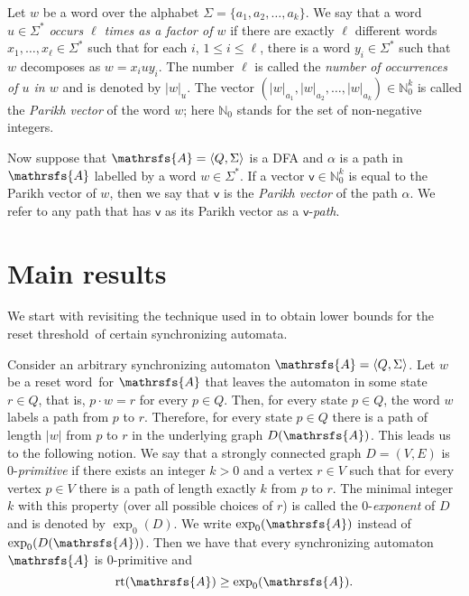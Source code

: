 \documentclass[12pt,twoside]{article}
\newcommand{\sa}{synchronizing automata}
\newcommand{\sw}{reset word}
\newcommand{\reth}{reset threshold}
\DeclareMathOperator{\rt}{rt}
\begin{document}
Let $w$ be a word over the alphabet $\Sigma = \{a_1, a_2, \ldots, a_k\}$. We
say that a word $u\in\Sigma^*$ \emph{occurs $\ell$ times as a factor of $w$} if
there are exactly $\ell$ different words $x_1, \ldots, x_\ell \in \Sigma^*$
such that for each $i$, $1 \leq i \leq \ell$, there is a word $y_i \in
\Sigma^*$ such that $w$ decomposes as $w = x_iuy_i$. The number $\ell$ is
called the \emph{number of occurrences of $u$ in $w$} and is denoted by
$|w|_u$. The vector $(|w|_{a_1}, |w|_{a_2}, \ldots,
|w|_{a_k})\in\mathbb{N}^k_0$ is called the \emph{Parikh vector} of the word
$w$; here $\mathbb{N}_0$ stands for the set of non-negative integers.

Now suppose that $\mathrsfs{A}=\langle Q,\Sigma\rangle$ is a DFA and $\alpha$
is a path in $\mathrsfs{A}$ labelled by a word $w\in\Sigma^*$. If a vector
$\mathsf{v}\in\mathbb{N}^k_0$ is equal to the Parikh vector of $w$, then we say
that $\mathsf{v}$ is the \emph{Parikh vector} of the path $\alpha$. We refer to
any path that has $\mathsf{v}$ as its Parikh vector as a
$\mathsf{v}$-\emph{path}.

\section{Main results}
\label{sea}

We start with revisiting the technique used in \cite{AGV} to obtain lower
bounds for the \reth\ of certain \sa.

Consider an arbitrary synchronizing automaton $\mathrsfs{A} = \langle Q, \Sigma
\rangle$. Let $w$ be a \sw\ for $\mathrsfs{A}$ that leaves the automaton in
some state $r \in Q$, that is, $p\cdot w=r$ for every $p\in Q$. Then, for every
state $p \in Q$, the word $w$ labels a path from $p$ to $r$. Therefore, for
every state $p \in Q$ there is a path of length $|w|$ from $p$ to $r$ in the
underlying graph $D(\mathrsfs{A})$. This leads us to the following notion. We
say that a strongly connected graph $D=(V,E)$ is 0-\emph{primitive} if there
exists an integer $k > 0$ and a vertex $r \in V$ such that for every vertex
$p\in V$ there is a path of length exactly $k$ from $p$ to $r$. The minimal
integer $k$ with this property (over all possible choices of $r$) is called the
0-\emph{exponent} of $D$ and is denoted by $\exp_0(D)$. We write
$\exp_0(\mathrsfs{A})$ instead of $\exp_0(D(\mathrsfs{A}))$. Then we have that
every synchronizing automaton $\mathrsfs{A}$ is 0-primitive and
\begin{equation}
\label{first inequality} \rt(\mathrsfs{A})\geq \exp_0(\mathrsfs{A}).
\end{equation}
\end{document}
